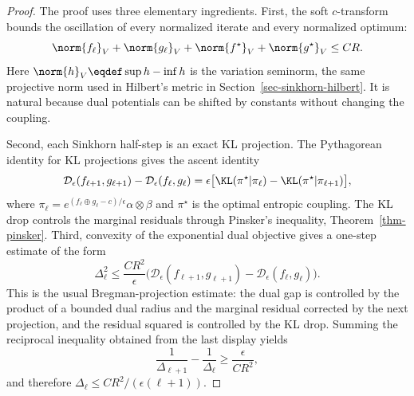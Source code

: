 \begin{proof}
	The proof uses three elementary ingredients. First, the soft $c$-transform bounds the oscillation of every normalized iterate and every normalized optimum:
	\[
		\norm{f_\ell}_V+\norm{g_\ell}_V+\norm{f^\star}_V+\norm{g^\star}_V \leq C R.
	\]
	Here $\norm{h}_V\eqdef\sup h-\inf h$ is the variation seminorm, the same projective norm used in Hilbert's metric in Section~\ref{sec-sinkhorn-hilbert}. It is natural because dual potentials can be shifted by constants without changing the coupling.

	Second, each Sinkhorn half-step is an exact KL projection. The Pythagorean identity for KL projections gives the ascent identity
	\[
		\mathcal D_\epsilon(f_{\ell+1},g_{\ell+1})-
		\mathcal D_\epsilon(f_\ell,g_\ell)
		=
		\epsilon\big[\KL(\pi^\star|\pi_\ell)-\KL(\pi^\star|\pi_{\ell+1})\big],
	\]
	where $\pi_\ell=e^{(f_\ell\oplus g_\ell-c)/\epsilon}\alpha\otimes\beta$ and $\pi^\star$ is the optimal entropic coupling. The KL drop controls the marginal residuals through Pinsker's inequality, Theorem~\ref{thm-pinsker}. Third, convexity of the exponential dual objective gives a one-step estimate of the form
	\[
		\Delta_\ell^2
		\leq
		\frac{C R^2}{\epsilon}
		\big(\mathcal D_\epsilon(f_{\ell+1},g_{\ell+1})-
		\mathcal D_\epsilon(f_\ell,g_\ell)\big).
	\]
	This is the usual Bregman-projection estimate: the dual gap is controlled by the product of a bounded dual radius and the marginal residual corrected by the next projection, and the residual squared is controlled by the KL drop. Summing the reciprocal inequality obtained from the last display yields
	\[
		\frac{1}{\Delta_{\ell+1}}-\frac{1}{\Delta_\ell}
		\geq \frac{\epsilon}{C R^2},
	\]
	and therefore $\Delta_\ell\leq C R^2/(\epsilon(\ell+1))$.
\end{proof}

